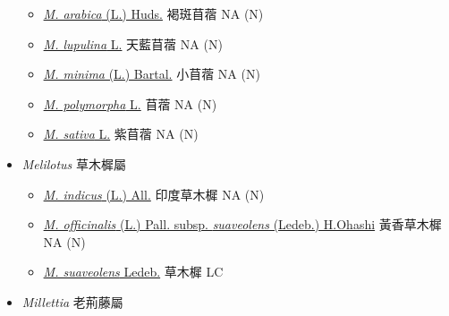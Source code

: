 \begin{itemize}
  \begin{itemize}
        \item[] \href{http://www.theplantlist.org/tpl1.1/search?q=Medicago+arabica}{\textit{M. arabica} (L.) Huds.}   褐斑苜蓿   NA (N)
        \item[] \href{http://www.theplantlist.org/tpl1.1/search?q=Medicago+lupulina}{\textit{M. lupulina} L.}   天藍苜蓿   NA (N)
        \item[] \href{http://www.theplantlist.org/tpl1.1/search?q=Medicago+minima}{\textit{M. minima} (L.) Bartal.}   小苜蓿   NA (N)
        \item[] \href{http://www.theplantlist.org/tpl1.1/search?q=Medicago+polymorpha}{\textit{M. polymorpha} L.}   苜蓿   NA (N)
        \item[] \href{http://www.theplantlist.org/tpl1.1/search?q=Medicago+sativa}{\textit{M. sativa} L.}   紫苜蓿   NA (N)
  \end{itemize}
 \item[] \textit{Melilotus} 草木樨屬
                                
  \begin{itemize}
        \item[] \href{http://www.theplantlist.org/tpl1.1/search?q=Melilotus+indicus}{\textit{M. indicus} (L.) All.}   印度草木樨   NA (N)
        \item[] \href{http://www.theplantlist.org/tpl1.1/search?q=Melilotus+officinalis+subsp.+suaveolens}{\textit{M. officinalis} (L.) Pall. subsp. \textit{suaveolens} (Ledeb.) H.Ohashi}   黃香草木樨   NA (N)
        \item[] \href{http://www.theplantlist.org/tpl1.1/search?q=Melilotus+suaveolens}{\textit{M. suaveolens} Ledeb.}   草木樨   LC
  \end{itemize}
 \item[] \textit{Millettia} 老荊藤屬
                                

\end{itemize}
